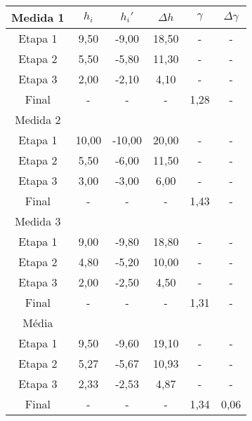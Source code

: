 \documentclass[a4paper]{ltxdoc}
\numberwithin{equation}{section}
\begin{document}
\begin{table}[H]
\begin{tabular}{|c|c|c|c|c|c|}
\hline
\rowcolor[HTML]{FFCCC9} 
Medida 1 & $h_i$ & $h_i'$ & $\Delta h$ & $\gamma$ & $\Delta \gamma$ \\ \hline
Etapa 1  & 9,50  & -9,00  & 18,50      & -        & -               \\ \hline
Etapa 2  & 5,50  & -5,80  & 11,30      & -        & -               \\ \hline
Etapa 3  & 2,00  & -2,10  & 4,10       & -        & -               \\ \hline
Final    & -     & -      & -          & 1,28     & -               \\ \hline
\rowcolor[HTML]{F8A102} 
Medida 2 &       &        &            &          &                 \\ \hline
Etapa 1  & 10,00 & -10,00 & 20,00      & -        & -               \\ \hline
Etapa 2  & 5,50  & -6,00  & 11,50      & -        & -               \\ \hline
Etapa 3  & 3,00  & -3,00  & 6,00       & -        & -               \\ \hline
Final    & -     & -      & -          & 1,43     & -               \\ \hline
\rowcolor[HTML]{F8FF00} 
Medida 3 &       &        &            &          &                 \\ \hline
Etapa 1  & 9,00  & -9,80  & 18,80      & -        & -               \\ \hline
Etapa 2  & 4,80  & -5,20  & 10,00      & -        & -               \\ \hline
Etapa 3  & 2,00  & -2,50  & 4,50       & -        & -               \\ \hline
Final    & -     & -      & -          & 1,31     & -               \\ \hline
\rowcolor[HTML]{6434FC} 
Média    &       &        &            &          &                 \\ \hline
Etapa 1  & 9,50  & -9,60  & 19,10      & -        & -               \\ \hline
Etapa 2  & 5,27  & -5,67  & 10,93      & -        & -               \\ \hline
Etapa 3  & 2,33  & -2,53  & 4,87       & -        & -               \\ \hline
Final    & -     & -      & -          & 1,34     & 0,06            \\ \hline
\end{tabular}
\end{table}
\end{document}
